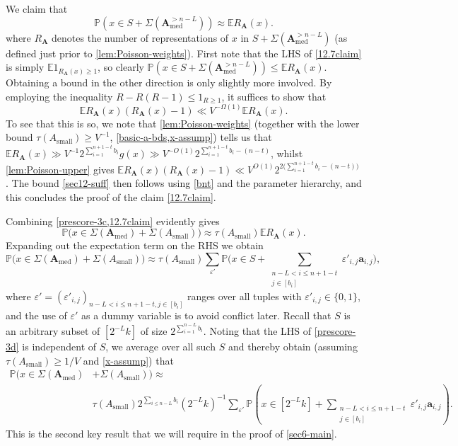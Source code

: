 \documentclass[11pt,reqno]{amsart}
\numberwithin{equation}{section}
\theoremstyle{definition}
\theoremstyle{remark}
\newcommand{\mb}{\mathbb}
\newcommand{\mbf}{\mathbf}
\newcommand{\eps}{\varepsilon}
\renewcommand{\le}{\leqslant}
\renewcommand{\ge}{\geqslant}
\def\sml{\operatorname{small}}
\def\med{\operatorname{med}}
\begin{document}
We claim that 
\begin{equation}\label{12.7claim}
 \mb{P}(x \in S + \Sigma(\mbf{A}_{\med}^{> n - L})) \approx \mb{E} R_{\mbf{A}}(x).
\end{equation}
where $R_{\mbf{A}}$ denotes the number of representations of $x$ in $S + \Sigma(\mbf{A}_{\med}^{> n - L})$ (as defined just prior to \cref{lem:Poisson-weights}). First note that the LHS of \cref{12.7claim} is simply $\mb{E} 1_{R_{\mbf{A}}(x) \ge 1}$, so clearly $\mb{P}(x \in S + \Sigma(\mbf{A}_{\med}^{> n - L})) \le \mb{E} R_{\mbf{A}}(x)$. Obtaining a bound in the other direction is only slightly more involved. By employing the inequality $R - R(R - 1) \le 1_{R \ge 1}$, it suffices to show that 
\begin{equation}\label{sec12-suff}
\mb{E} R_{\mbf{A}}(x) (R_{\mbf{A}}(x) - 1) \ll V^{-\Omega(1)}\mb{E} R_{\mbf{A}}(x).
\end{equation}
To see that this is so, we note that \cref{lem:Poisson-weights} (together with the lower bound $\tau(A_{\sml}) \ge V^{-1}$, \cref{basic-a-bds,x-assump}) tells us that $\mb{E} R_{\mbf{A}}(x) \gg V^{-1}  2^{\sum_{i =1}^{n + 1 - t} b_i} g(x) \gg V^{-O(1)} 2^{\sum_{i =1}^{n + 1 - t} b_i - (n - t)}$, whilst \cref{lem:Poisson-upper} gives $\mb{E} R_{\mbf{A}}(x) (R_{\mbf{A}}(x) - 1) \ll V^{O(1)} 2^{2\big(\sum_{i=1}^{n + 1 - t} b_i - (n - t)\big)}$. The bound \cref{sec12-suff} then follows using \cref{bnt} and the parameter hierarchy, and this concludes the proof of the claim \cref{12.7claim}.

Combining \cref{prescore-3c,12.7claim} evidently gives
\[ \mb{P}\big(x \in \Sigma(\mbf{A}_{\med}) + \Sigma(A_{\sml})\big) \approx \tau(A_{\sml})\mb{E} R_{\mbf{A}}(x) .\] Expanding out the expectation term on the RHS we obtain
\begin{equation}\label{prescore-3d} 
 \mb{P}\big(x \in \Sigma(\mbf{A}_{\med}) + \Sigma(A_{\sml})\big) \approx \tau(A_{\sml}) \sum_{\eps'} \mb{P}\big(x \in S + \sum_{\substack{n - L < i \le n +1 - t\\ j \in [b_i]}} \eps'_{i,j} \mbf{a}_{i,j} \big) ,
\end{equation}
where $\eps' = (\eps'_{i,j})_{n - L < i \le n +1 - t, j \in [b_i]}$ ranges over all tuples with $\eps'_{i,j} \in \{0,1\}$, and the use of $\eps'$ as a dummy variable is to avoid conflict later.
Recall that $S$ is an arbitrary subset of $[2^{-L} k]$ of size $2^{\sum_{i =1}^{n - L} b_i}$. Noting that the LHS of \cref{prescore-3d} is independent of $S$, we average over all such $S$ and thereby obtain (assuming $\tau(A_{\sml}) \ge 1/V$ and \cref{x-assump}) that
\begin{align}\nonumber
\mb{P}\big(x \in \Sigma(\mbf{A}_{\med}) & + \Sigma(A_{\sml})\big) \approx \\ &  
\tau(A_{\sml}) 2^{\sum_{i \le n - L} b_i} (2^{-L} k)^{-1}\sum_{\eps'} \mb{P}(x \in [2^{-L} k] + \sum_{\substack{n - L < i \le n +1 - t\\ j \in [b_i]}}\eps'_{i,j} \mbf{a}_{i,j} ).\label{prescore-3e} \end{align} 
This is the second key result that we will require in the proof of \cref{sec6-main}.
\end{document}
